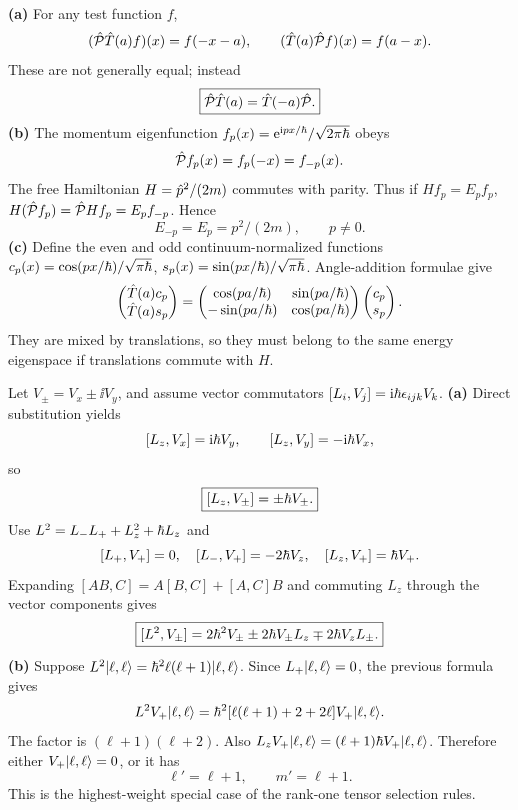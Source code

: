 \textbf{(a)} For any test function $f$,
\[
(\hat{\mathcal P}\hat T(a)f)(x)=f(-x-a),\qquad
(\hat T(a)\hat{\mathcal P} f)(x)=f(a-x).
\]
These are not generally equal; instead
\begin{equation}
\boxed{\hat{\mathcal P}\hat T(a)=\hat T(-a)\hat{\mathcal P}.}
\end{equation}
\textbf{(b)} The momentum eigenfunction
$f_p(x)=\mathrm e^{\mathrm i px/\hbar}/\sqrt{2\pi\hbar}$
obeys
\[
\hat{\mathcal P} f_p(x)=f_p(-x)=f_{-p}(x).
\]
The free Hamiltonian $H=\hat p^2/(2m)$
commutes with parity. Thus if
$Hf_p=E_pf_p$,
$H(\hat{\mathcal P} f_p)=\hat{\mathcal P} Hf_p=E_p f_{-p}$.
Hence
\begin{equation}
\boxed{E_{-p}=E_p=p^2/(2m),\qquad p\ne0.}
\end{equation}
\textbf{(c)} Define the even and odd
continuum-normalized functions
$c_p(x)=\cos(px/\hbar)/\sqrt{\pi\hbar}$,
$s_p(x)=\sin(px/\hbar)/\sqrt{\pi\hbar}$.
Angle-addition formulae give
\[
\begin{pmatrix}\hat T(a)c_p\\\hat T(a)s_p\end{pmatrix}
=
\begin{pmatrix}
\cos(pa/\hbar)&\sin(pa/\hbar)\\
-\sin(pa/\hbar)&\cos(pa/\hbar)
\end{pmatrix}
\begin{pmatrix}c_p\\s_p\end{pmatrix}.
\]
They are mixed by translations, so
they must belong to the same energy
eigenspace if translations commute
with $H$.

Let $V_\pm=V_x\pm\ii V_y$,
and assume vector commutators
$[L_i,V_j]=\mathrm i\hbar\epsilon_{ijk}V_k$.
\textbf{(a)} Direct substitution yields
\[
[L_z,V_x]=\mathrm i\hbar V_y,\qquad
[L_z,V_y]=-\mathrm i\hbar V_x,
\]
so
\begin{equation}
\boxed{[L_z,V_\pm]=\pm\hbar V_\pm.}
\end{equation}
Use $L^2=L_-L_++L_z^2+\hbar L_z$
and
\[
[L_+,V_+]=0,\quad
[L_-,V_+]=-2\hbar V_z,\quad
[L_z,V_+]=\hbar V_+.
\]
Expanding $[AB,C]=A[B,C]+[A,C]B$
and commuting $L_z$ through the
vector components gives
\begin{equation}
\boxed{[L^2,V_\pm]=
2\hbar^2V_\pm
\pm2\hbar V_\pm L_z
\mp2\hbar V_zL_\pm.}
\end{equation}
\textbf{(b)} Suppose
$L^2\lvert \ell,\ell\rangle
=\hbar^2\ell(\ell+1)\lvert \ell,\ell\rangle$.
Since $L_+\lvert \ell,\ell\rangle=0$,
the previous formula gives
\[
L^2 V_+\lvert \ell,\ell\rangle
=\hbar^2[\ell(\ell+1)+2+2\ell]
V_+\lvert \ell,\ell\rangle.
\]
The factor is $(\ell+1)(\ell+2)$.
Also
$L_zV_+\lvert \ell,\ell\rangle
=(\ell+1)\hbar V_+\lvert \ell,\ell\rangle$.
Therefore either
$V_+\lvert \ell,\ell\rangle=0$, or it has
\begin{equation}
\boxed{\ell'=\ell+1,\qquad
m'=\ell+1.}
\end{equation}
This is the highest-weight special
case of the rank-one tensor
selection rules.

